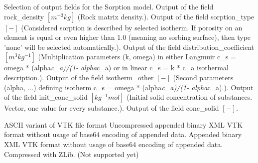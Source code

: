 \begin{SelectionType}
	{}
	{{{Selection of output fields for the Sorption model.}}}
		\KeyItem
			{}
			{{{Output of the field rock{\_}density }{$[m^{-3}kg]$}{ (Rock matrix density.).}}}
		\KeyItem
			{}
			{{{Output of the field sorption{\_}type }{$[-]$}{ (Considered sorption is described by selected isotherm. If porosity on an element is equal or even higher than 1.0 (meaning no sorbing surface), then type 'none' will be selected automatically.).}}}
		\KeyItem
			{}
			{{{Output of the field distribution{\_}coefficient }{$[m^{3}kg^{-1}]$}{ (Multiplication parameters (k, omega) in either Langmuir c{\_}s = omega * (alpha}\textit{c{\_}a)/(1- alpha}{c{\_}a) or in linear c{\_}s = k * c{\_}a isothermal description.).}}}
		\KeyItem
			{}
			{{{Output of the field isotherm{\_}other }{$[-]$}{ (Second parameters (alpha, ...) defining isotherm  c{\_}s = omega * (alpha}\textit{c{\_}a)/(1- alpha}{c{\_}a).).}}}
		\KeyItem
			{}
			{{{Output of the field init{\_}conc{\_}solid }{$[kg^{-1}mol]$}{ (Initial solid concentration of substances. Vector, one value for every substance.).}}}
		\KeyItem
			{}
			{{{Output of the field conc{\_}solid }{$[-]$}{.}}}
\end{SelectionType}
\begin{SelectionType}
	{}
	{}
		\KeyItem
			{}
			{{{ASCII variant of VTK file format}}}
		\KeyItem
			{}
			{{{Uncompressed appended binary XML VTK format without usage of base64 encoding of appended data.}}}
		\KeyItem
			{}
			{{{Appended binary XML VTK format without usage of base64 encoding of appended data. Compressed with ZLib. (Not supported yet)}}}
\end{SelectionType}
